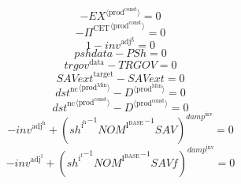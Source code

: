 \begin{equation}
-{{E\!X}}^{\langle \mathrm{prod}^{\mathrm{const}}\rangle} = 0
\end{equation}
\begin{equation}
-{\Pi^{\mathrm{CET}}}^{\langle \mathrm{prod}^{\mathrm{const}}\rangle} = 0
\end{equation}
\begin{equation}
1 - {i\!n\!v}^{\mathrm{adj}^{\mathrm{g}}} = 0
\end{equation}
\begin{equation}
{p\!s\!h\!d\!a\!t\!a} - {P\!S\!h} = 0
\end{equation}
\begin{equation}
{t\!r\!g\!o\!v}^{\mathrm{data}} - {T\!R\!G\!O\!V} = 0
\end{equation}
\begin{equation}
{S\!A\!V\!e\!x\!t}^{\mathrm{target}} - {S\!A\!V\!e\!x\!t} = 0
\end{equation}
\begin{equation}
{{d\!s\!t}^{\mathrm{nc}}}^{\langle \mathrm{\mathrm{prod}^{\mathrm{Min}}}\rangle} - {D}^{\langle \mathrm{prod}^{\mathrm{Min}}\rangle} = 0
\end{equation}
\begin{equation}
{{d\!s\!t}^{\mathrm{nc}}}^{\langle \mathrm{\mathrm{prod}^{\mathrm{const}}}\rangle} - {D}^{\langle \mathrm{prod}^{\mathrm{const}}\rangle} = 0
\end{equation}
\begin{equation}
-{i\!n\!v}^{\mathrm{adj}^{\mathrm{h}}} + \left({{s\!h}^{\mathrm{i}^{\mathrm{h}}}}^{-1} {{N\!O\!M}^{\mathrm{I}^{\mathrm{BASE}}}}^{-1} {{S\!A\!V}}\right)^{{d\!a\!m\!p}^{\mathrm{inv}}} = 0
\end{equation}
\begin{equation}
-{i\!n\!v}^{\mathrm{adj}^{\mathrm{f}}} + \left({{s\!h}^{\mathrm{i}^{\mathrm{f}}}}^{-1} {{N\!O\!M}^{\mathrm{I}^{\mathrm{BASE}}}}^{-1} {{S\!A\!V\!f}}\right)^{{d\!a\!m\!p}^{\mathrm{inv}}} = 0
\end{equation}
